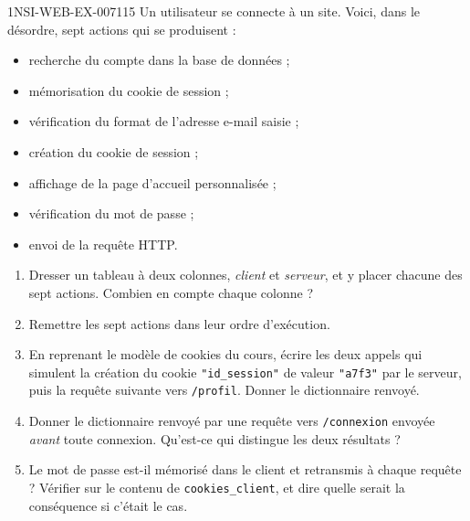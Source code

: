 \begin{exercice}{1NSI-WEB-EX-007}{1}{15}
Un utilisateur se connecte à un site. Voici, dans le désordre, sept actions qui
se produisent :
\begin{itemize}
  \item[(a)] recherche du compte dans la base de données ;
  \item[(b)] mémorisation du cookie de session ;
  \item[(c)] vérification du format de l'adresse e-mail saisie ;
  \item[(d)] création du cookie de session ;
  \item[(e)] affichage de la page d'accueil personnalisée ;
  \item[(f)] vérification du mot de passe ;
  \item[(g)] envoi de la requête HTTP.
\end{itemize}
\begin{enumerate}
  \item Dresser un tableau à deux colonnes, \emph{client} et \emph{serveur}, et y
    placer chacune des sept actions. Combien en compte chaque colonne ?
  \item Remettre les sept actions dans leur ordre d'exécution.
  \item En reprenant le modèle de cookies du cours, écrire les deux appels qui
    simulent la création du cookie \lstinline{"id_session"} de valeur
    \lstinline{"a7f3"} par le serveur, puis la requête suivante vers
    \lstinline{/profil}. Donner le dictionnaire renvoyé.
  \item Donner le dictionnaire renvoyé par une requête vers
    \lstinline{/connexion} envoyée \emph{avant} toute connexion. Qu'est-ce qui
    distingue les deux résultats ?
  \item Le mot de passe est-il mémorisé dans le client et retransmis à chaque
    requête ? Vérifier sur le contenu de \lstinline{cookies_client}, et dire
    quelle serait la conséquence si c'était le cas.
\end{enumerate}
\end{exercice}
